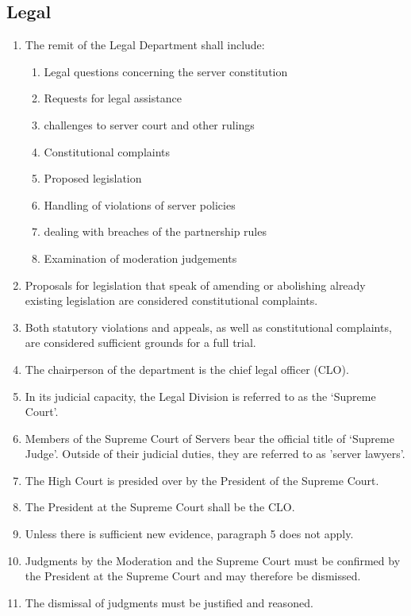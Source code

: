 \documentclass{article}
\begin{document}
\subsection{Legal}
\begin{enumerate}[(1)]
	\item The remit of the Legal Department shall include:
	\begin{enumerate}[(1)]
		\item Legal questions concerning the server constitution
		\item Requests for legal assistance
		\item challenges to server court and other rulings
		\item Constitutional complaints
		\item Proposed legislation
		\item Handling of violations of server policies
		\item dealing with breaches of the partnership rules
		\item Examination of moderation judgements
	\end{enumerate}
    \item Proposals for legislation that speak of amending or abolishing already existing legislation are considered constitutional complaints.
	\item Both statutory violations and appeals, as well as constitutional complaints, are considered sufficient grounds for a full trial.
	\item The chairperson of the department is the chief legal officer (CLO).
	\item In its judicial capacity, the Legal Division is referred to as the `Supreme Court'.
	\item Members of the Supreme Court of Servers bear the official title of `Supreme Judge'. Outside of their judicial duties, they are referred to as 'server lawyers'.
	\item The High Court is presided over by the President of the Supreme Court.
    \item The President at the Supreme Court shall be the CLO.\@
	\item Unless there is sufficient new evidence, paragraph 5 does not apply.
	\item Judgments by the Moderation and the Supreme Court must be confirmed by the President at the Supreme Court and may therefore be dismissed.
	\item The dismissal of judgments must be justified and reasoned.
\end{enumerate}
\end{document}
